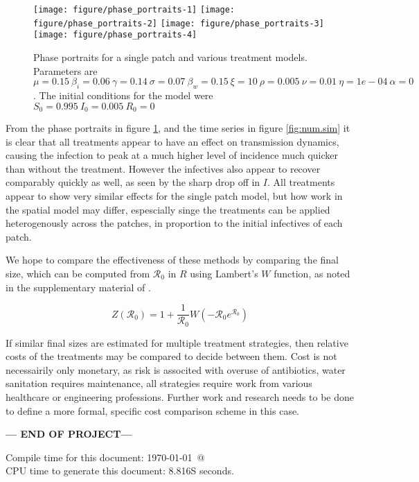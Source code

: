 \documentclass[12pt]{article}\usepackage[]{graphicx}\usepackage[]{color}
\newenvironment{knitrout}{}{} %
\begin{document}
\begin{knitrout}
\color{fgcolor}\begin{figure}

{\centering \texttt{[image: figure/phase\_portraits-1]} 
\texttt{[image: figure/phase\_portraits-2]} 
\texttt{[image: figure/phase\_portraits-3]} 
\texttt{[image: figure/phase\_portraits-4]} 

}

\caption{\label{fig:phase.portraits} Phase portraits for a single patch and various treatment models. Parameters are $\mu=0.15\ \beta_i=0.06\ \gamma=0.14\ \sigma=0.07\ \beta_w=0.15\ \xi=10\ \rho=0.005\ \nu=0.01\ \eta=1e-04\ \alpha=0$. The initial conditions for the model were $S_0=0.995\ I_0=0.005\ R_0=0$}\label{fig:phase.portraits}
\end{figure}


\end{knitrout}

\FloatBarrier

From the phase portraits in figure \ref{fig:phase.portraits}, and the time series in figure \ref{fig:num.sim} it is clear that all treatments appear to have an effect on transmission dynamics, causing the infection to peak at a much higher level of incidence much quicker than without the treatment.
However the infectives also appear to recover comparably quickly as well, as seen by the sharp drop off in $I$.
All treatments appear to show very similar effects for the single patch model, but how work in the spatial model may differ, espescially singe the treatments can be applied heterogenously across the patches, in proportion to the initial infectives of each patch.

We hope to compare the effectiveness of these methods by comparing the final size, which can be computed from ${\mathcal R_0}$ in $R$ using Lambert's $W$ function, as noted in the supplementary material of \cite{link20}.
\begin{linenomath}
\begin{equation}
    Z({\mathcal R_0}) = 1+\frac{1}{{\mathcal R_0}}W(-{\mathcal R_0}e^{{\mathcal R_0}})
\end{equation}
\end{linenomath}
If similar final sizes are estimated for multiple treatment strategies, then relative costs of the treatments may be compared to decide between them.
Cost is not necessairily only monetary, as risk is associted with overuse of antibiotics, water sanitation requires maintenance, all strategies require work from various healthcare or engineering professions.
Further work and research needs to be done to define a more formal, specific cost comparison scheme in this case.



\bigskip\vfill
\centerline{\bf--- END OF PROJECT---}
\bigskip
Compile time for this document:
\today\ @ \thistime\\
CPU time to generate this document: 8.816S seconds.
\printbibliography
\end{document}
